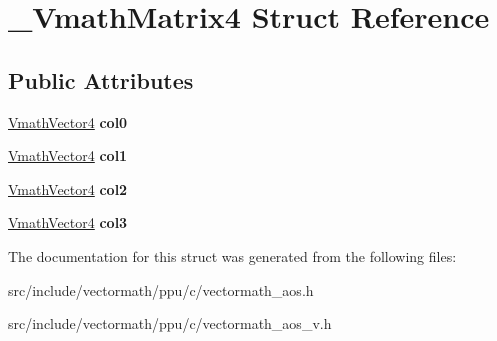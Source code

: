 \hypertarget{struct__VmathMatrix4}{\section{\-\_\-\-Vmath\-Matrix4 Struct Reference}
\label{struct__VmathMatrix4}
}
\subsection*{Public Attributes}
\begin{DoxyCompactItemize}
\item 
\hypertarget{struct__VmathMatrix4_a898c8e6a41a14c1653a1ac0e12a16676}{\hyperlink{struct__VmathVector4}{Vmath\-Vector4} {\bfseries col0}}\label{struct__VmathMatrix4_a898c8e6a41a14c1653a1ac0e12a16676}

\item 
\hypertarget{struct__VmathMatrix4_ac36ca6eb47ecd42a5cf52f8ce3b54d66}{\hyperlink{struct__VmathVector4}{Vmath\-Vector4} {\bfseries col1}}\label{struct__VmathMatrix4_ac36ca6eb47ecd42a5cf52f8ce3b54d66}

\item 
\hypertarget{struct__VmathMatrix4_a095d91a32becd0c538a1703d92597317}{\hyperlink{struct__VmathVector4}{Vmath\-Vector4} {\bfseries col2}}\label{struct__VmathMatrix4_a095d91a32becd0c538a1703d92597317}

\item 
\hypertarget{struct__VmathMatrix4_a89ccade95d66e0a958ac0aaab43664f5}{\hyperlink{struct__VmathVector4}{Vmath\-Vector4} {\bfseries col3}}\label{struct__VmathMatrix4_a89ccade95d66e0a958ac0aaab43664f5}

\end{DoxyCompactItemize}


The documentation for this struct was generated from the following files\-:\begin{DoxyCompactItemize}
\item 
src/include/vectormath/ppu/c/vectormath\-\_\-aos.\-h\item 
src/include/vectormath/ppu/c/vectormath\-\_\-aos\-\_\-v.\-h\end{DoxyCompactItemize}
